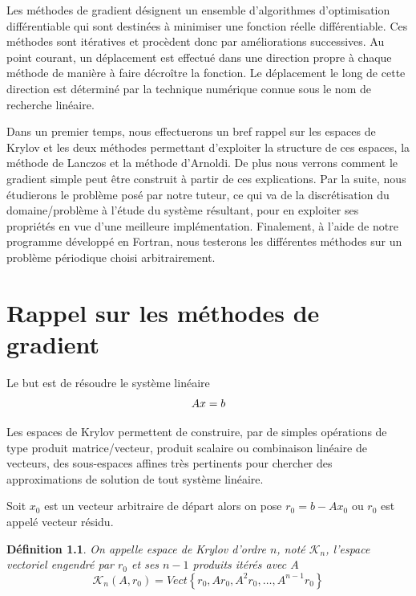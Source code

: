 \documentclass[twoside,12pt]{report}
\newtheorem*{def*}{Définition}
\theoremstyle{remark}
\begin{document}
Les méthodes de gradient désignent un ensemble d'algorithmes d'optimisation différentiable qui sont destinées à minimiser une fonction réelle différentiable. Ces méthodes sont itératives et procèdent donc par améliorations successives. Au point courant, un déplacement est effectué dans une direction propre à chaque méthode de manière à faire décroître la fonction. Le déplacement le long de cette direction est déterminé par la technique numérique connue sous le nom de recherche linéaire.

Dans un premier temps, nous effectuerons un bref rappel sur les espaces de Krylov et les deux méthodes permettant d'exploiter la structure de ces espaces, la méthode de Lanczos et la méthode d'Arnoldi. De plus nous verrons comment le gradient simple peut être construit à partir de ces explications. Par la suite, nous étudierons le problème posé par notre tuteur, ce qui va de la discrétisation du domaine/problème à l'étude du système résultant, pour en exploiter ses propriétés en vue d'une meilleure implémentation. Finalement, à l'aide de notre programme développé en Fortran, nous testerons les différentes méthodes sur un problème périodique choisi arbitrairement.



\chapter{Rappel sur les méthodes de gradient}

Le but est de résoudre le système linéaire
\begin{equation}
Ax=b \label{system}
\vspace{0.2cm}
\end{equation}

Les espaces de Krylov permettent de construire, par de simples opérations de type produit matrice/vecteur, produit scalaire ou combinaison linéaire de vecteurs, des sous-espaces affines très pertinents pour chercher des approximations de solution de tout système linéaire.

Soit $x_0$ est un vecteur arbitraire de départ alors on pose $r_0=b-Ax_0$ ou $r_0$ est appelé vecteur résidu.
\begin{def*}
On appelle espace de Krylov d'ordre $n$, noté $\mathcal{K}_n$, l'espace vectoriel engendré par $r_0$ et ses $n-1$ produits itérés avec $A$
\begin{equation*}
\mathcal{K}_n(A,r_0)=Vect\left \{r_0,Ar_0,A^2r_0,\ldots,A^{n-1}r_0\right \}
\end{equation*}
\end{def*}
\end{document}
